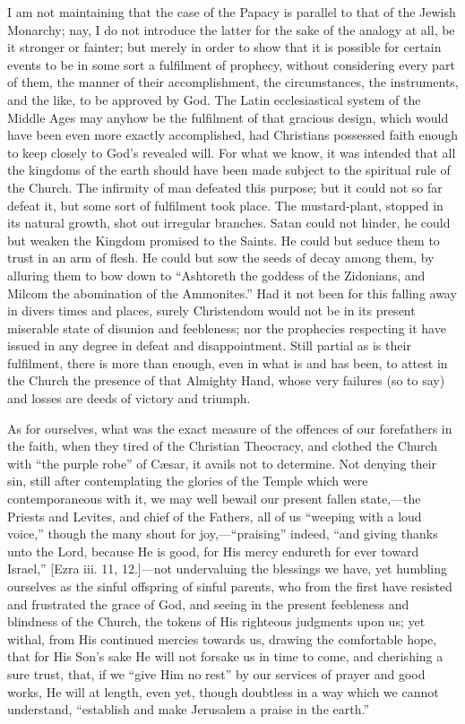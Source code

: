 I am not maintaining that the case of the Papacy is parallel to that
of the Jewish Monarchy; nay, I do not introduce the latter for the sake
of the analogy at all, be it stronger or fainter; but merely in order to
show that it is possible for certain events to be in some sort a
fulfilment of prophecy, without considering every part of them, the
manner of their accomplishment, the circumstances, the instruments, and
the like, to be approved by God. The Latin ecclesiastical system of the
Middle Ages may anyhow be the fulfilment of that gracious design, which
would have been even more exactly accomplished, had Christians possessed
faith enough to keep closely to God's revealed will. For what we know,
it was intended that all the kingdoms of the earth should have been made
subject to the spiritual rule of the Church. The infirmity of man
defeated this purpose; but it could not so far defeat it, but some sort
of fulfilment took place. The mustard-plant, stopped in its natural
growth, shot out irregular branches. Satan could not hinder, he could
but weaken the Kingdom promised to the Saints. He could but seduce them
to trust in an arm of flesh. He could but sow the seeds of decay among
them, by alluring them to bow down to ``Ashtoreth the goddess of the
Zidonians, and Milcom the abomination of the Ammonites.'' Had it not
been for this falling away in divers times and places, surely
Christendom would not be in its present miserable state of disunion and
feebleness; nor the prophecies respecting it have issued in any degree
in defeat and disappointment. Still partial as is their fulfilment,
there is more than enough, even in what is and has been, to attest in
the Church the presence of that Almighty Hand, whose very failures (so
to say) and losses are deeds of victory and triumph.

As for ourselves, what was the exact measure of the offences of our
forefathers in the faith, when they tired of the Christian Theocracy,
and clothed the Church with ``the purple robe'' of Cæsar, it
avails not to determine. Not denying their sin, still after
contemplating the glories of the Temple which were contemporaneous with
it, we may well bewail our present fallen state,—the Priests and
Levites, and chief of the Fathers, all of us ``weeping with a loud
voice,'' though the many shout for joy,—``praising''
indeed, ``and giving thanks unto the Lord, because He is good, for
His mercy endureth for ever toward Israel,'' [Ezra iii. 11, 12.]—not
undervaluing the blessings we have, yet humbling ourselves as the sinful
offspring of sinful parents, who from the first have resisted and
frustrated the grace of God, and seeing in the present feebleness and
blindness of the Church, the tokens of His righteous judgments upon us;
yet withal, from His continued mercies towards us, drawing the
comfortable hope, that for His Son's sake He will not forsake us in time
to come, and cherishing a sure trust, that, if we ``give Him no
rest'' by our services of prayer and good works, He will at length, even
yet, though doubtless in a way which we cannot understand,
``establish and make Jerusalem a praise in the earth.''

